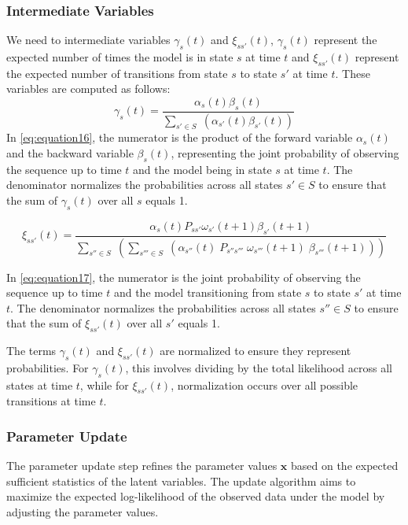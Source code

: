 \subsubsection{Intermediate Variables}
We need to intermediate variables $\gamma_s(t)$ and $\xi_{ss'}(t)$, $\gamma_s(t)$ represent the expected number of times the model is in state $s$ at time $t$ and $\xi_{ss'}(t)$ represent the expected number of transitions from state $s$ to state $s'$ at time $t$. These variables are computed as follows:
\begin{equation}
    \gamma_s(t) = \frac{\alpha_s(t) \beta_s(t)}{\sum_{s' \in S} \;(\alpha_{s'}(t) \beta_{s'}(t))}
    \label{eq:equation16}
\end{equation}
In \autoref{eq:equation16}, the numerator is the product of the forward variable $\alpha_s(t)$ and the backward variable $\beta_s(t)$, representing the joint probability of observing the sequence up to time $t$ and the model being in state $s$ at time $t$. The denominator normalizes the probabilities across all states $s' \in S$ to ensure that the sum of $\gamma_s(t)$ over all $s$ equals 1.

\begin{equation}
    \xi_{ss'}(t) = \frac{\alpha_s(t) P_{ss'} \omega_{s'}(t + 1) \beta_{s'}(t + 1)}{\sum_{s'' \in S} \;(\sum_{s''' \in S} \; (\alpha_{s''}(t) \; P_{s''s'''} \; \omega_{s'''}(t + 1) \; \beta_{s'''}(t + 1)))}
    \label{eq:equation17}
\end{equation}

In \autoref{eq:equation17}, the numerator is the joint probability of observing the sequence up to time $t$ and the model transitioning from state $s$ to state $s'$ at time $t$. The denominator normalizes the probabilities across all states $s'' \in S$ to ensure that the sum of $\xi_{ss'}(t)$ over all $s'$ equals 1.

The terms $\gamma_s(t)$ and $\xi_{ss'}(t)$ are normalized to ensure they represent probabilities. For $\gamma_s(t)$, this involves dividing by the total likelihood across all states at time $t$, while for $\xi_{ss'}(t)$, normalization occurs over all possible transitions at time $t$.

\subsubsection{Parameter Update}
The parameter update step refines the parameter values $\mathbf{x}$ based on the expected sufficient statistics of the latent variables. The update algorithm aims to maximize the expected log-likelihood of the observed data under the model by adjusting the parameter values.

